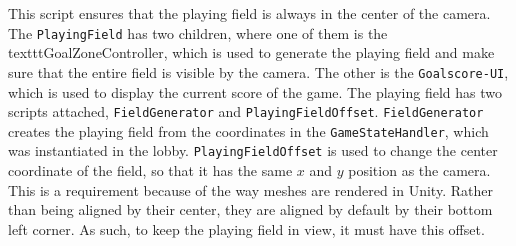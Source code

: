 This script ensures that the playing field is always in the center of the camera.
The \texttt{PlayingField} has two children, where one of them is the texttt{GoalZoneController}, which is used to generate the playing field and make sure that the entire field is visible by the camera.
The other is the \texttt{Goalscore-UI}, which is used to display the current score of the game.
The playing field has two scripts attached, \texttt{FieldGenerator} and \texttt{PlayingFieldOffset}.
\texttt{FieldGenerator} creates the playing field from the coordinates in the \texttt{GameStateHandler}, which was instantiated in the lobby.
\texttt{PlayingFieldOffset} is used to change the center coordinate of the field, so that it has the same $x$ and $y$ position as the camera.
This is a requirement because of the way meshes are rendered in Unity.
Rather than being aligned by their center, they are aligned by default by their bottom left corner.
As such, to keep the playing field in view, it must have this offset.
